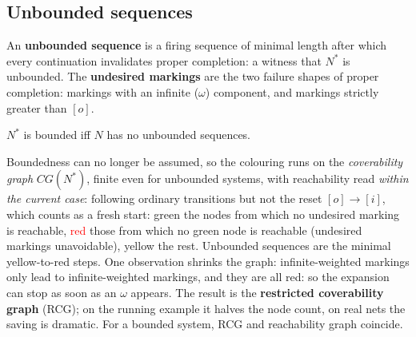 \subsection{Unbounded sequences}

\begin{definition}
An \textbf{unbounded sequence} is a firing sequence of minimal length after which every continuation invalidates proper completion: a witness that $N^{*}$ is unbounded. The \textbf{undesired markings} are the two failure shapes of proper completion: markings with an infinite ($\omega$) component, and markings strictly greater than $[o]$.
\end{definition}

\begin{proposition}
$N^{*}$ is bounded iff $N$ has no unbounded sequences.
\end{proposition}
Boundedness can no longer be assumed, so the colouring runs on the \emph{coverability graph} $\mathit{CG}(N^{*})$, finite even for unbounded systems, with reachability read \emph{within the current case}: following ordinary transitions but not the reset $[o]\to[i]$, which counts as a fresh start: \textcolor{green!50!black}{green} the nodes from which no undesired marking is reachable, \textcolor{red}{red} those from which no green node is reachable (undesired markings unavoidable), yellow the rest. Unbounded sequences are the minimal yellow-to-red steps. One observation shrinks the graph: infinite-weighted markings only lead to infinite-weighted markings, and they are all red: so the expansion can stop as soon as an $\omega$ appears. The result is the \textbf{restricted coverability graph} (RCG); on the running example it halves the node count, on real nets the saving is dramatic. For a bounded system, RCG and reachability graph coincide.
